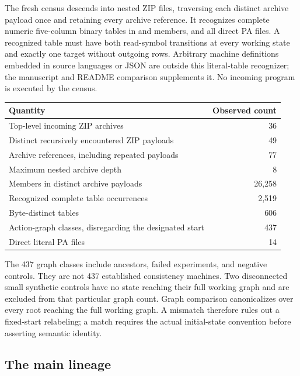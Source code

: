 \documentclass[11pt]{article}
\newcommand{\file}[1]{\texttt{\detokenize{#1}}}
\theoremstyle{definition}
\theoremstyle{remark}
\begin{document}
The fresh census descends into nested ZIP files, traversing each distinct
archive payload once and retaining every archive reference. It recognizes
complete numeric five-column binary tables in \file{.tm} and \file{.txt}
members, and all direct PA \file{.tm} files. A recognized table must have
both read-symbol transitions at every working state and exactly one target
without outgoing rows. Arbitrary machine definitions embedded in source
languages or JSON are outside this literal-table recognizer; the manuscript
and README comparison supplements it. No incoming program is executed by
the census.

\begin{center}
\begin{tabular}{@{}lr@{}}
\toprule
Quantity & Observed count\\\midrule
Top-level incoming ZIP archives &36\\
Distinct recursively encountered ZIP payloads &49\\
Archive references, including repeated payloads &77\\
Maximum nested archive depth &8\\
Members in distinct archive payloads &26,258\\
Recognized complete table occurrences &2,519\\
Byte-distinct tables &606\\
Action-graph classes, disregarding the designated start &437\\
Direct literal PA \file{.tm} files &14\\
\bottomrule
\end{tabular}
\end{center}

The 437 graph classes include ancestors, failed experiments, and negative
controls. They are not 437 established consistency machines. Two
disconnected small synthetic controls have no state reaching their full
working graph and are excluded from that particular graph count.
Graph comparison canonicalizes over every root reaching the full working
graph. A mismatch therefore rules out a fixed-start relabeling; a match
requires the actual initial-state convention before asserting semantic
identity.

\subsection{The main lineage}


\end{document}
